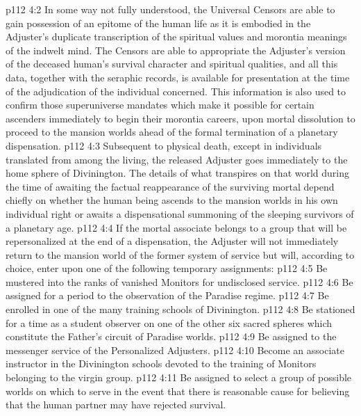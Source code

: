 \vs p112 4:2 In some way not fully understood, the Universal Censors are able to gain possession of an epitome of the human life as it is embodied in the Adjuster’s duplicate transcription of the spiritual values and morontia meanings of the indwelt mind. The Censors are able to appropriate the Adjuster’s version of the deceased human’s survival character and spiritual qualities, and all this data, together with the seraphic records, is available for presentation at the time of the adjudication of the individual concerned. This information is also used to confirm those superuniverse mandates which make it possible for certain ascenders immediately to begin their morontia careers, upon mortal dissolution to proceed to the mansion worlds ahead of the formal termination of a planetary dispensation.
\vs p112 4:3 Subsequent to physical death, except in individuals translated from among the living, the released Adjuster goes immediately to the home sphere of Divinington. The details of what transpires on that world during the time of awaiting the factual reappearance of the surviving mortal depend chiefly on whether the human being ascends to the mansion worlds in his own individual right or awaits a dispensational summoning of the sleeping survivors of a planetary age.
\vs p112 4:4 If the mortal associate belongs to a group that will be repersonalized at the end of a dispensation, the Adjuster will not immediately return to the mansion world of the former system of service but will, according to choice, enter upon one of the following temporary assignments:
\vs p112 4:5 \bibnobreakspace Be mustered into the ranks of vanished Monitors for undisclosed service.
\vs p112 4:6 \bibnobreakspace Be assigned for a period to the observation of the Paradise regime.
\vs p112 4:7 \bibnobreakspace Be enrolled in one of the many training schools of Divinington.
\vs p112 4:8 \bibnobreakspace Be stationed for a time as a student observer on one of the other six sacred spheres which constitute the Father’s circuit of Paradise worlds.
\vs p112 4:9 \bibnobreakspace Be assigned to the messenger service of the Personalized Adjusters.
\vs p112 4:10 \bibnobreakspace Become an associate instructor in the Divinington schools devoted to the training of Monitors belonging to the virgin group.
\vs p112 4:11 \bibnobreakspace Be assigned to select a group of possible worlds on which to serve in the event that there is reasonable cause for believing that the human partner may have rejected survival.
